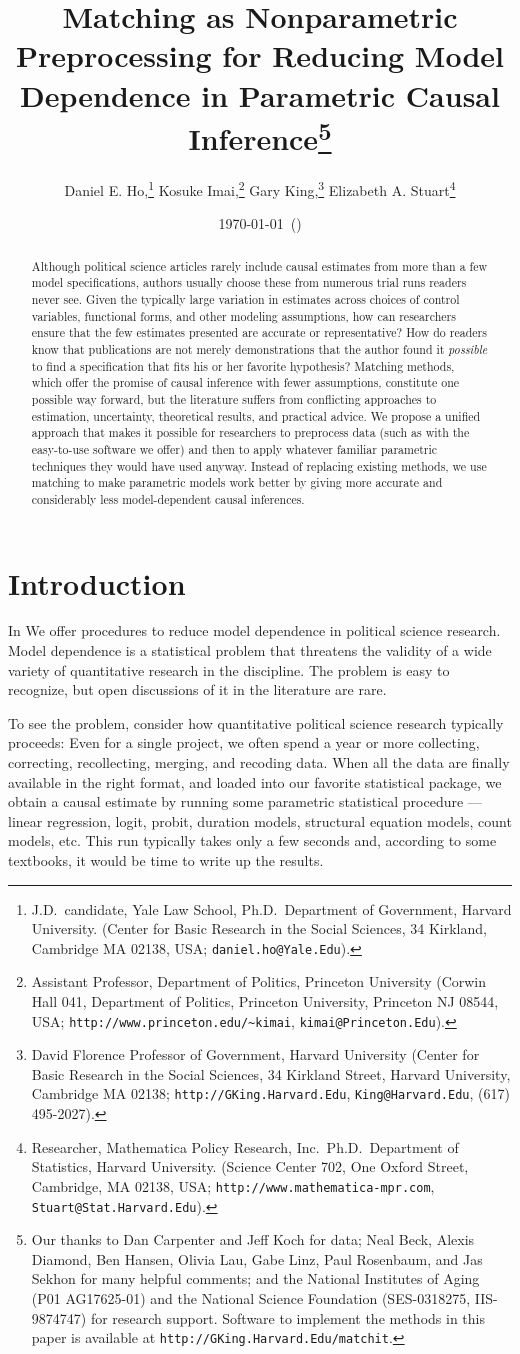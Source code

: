 \documentclass[11pt,titlepage]{article}
\title{Matching as Nonparametric Preprocessing for Reducing Model
  Dependence in Parametric Causal Inference\thanks{Our thanks to Dan
    Carpenter and Jeff Koch for data; Neal Beck, Alexis Diamond, Ben
    Hansen, Olivia Lau, Gabe Linz, Paul Rosenbaum, and Jas Sekhon for
    many helpful comments; and the National Institutes of Aging (P01
    AG17625-01) and the National Science Foundation (SES-0318275,
    IIS-9874747) for research support.  Software to implement the
    methods in this paper is available at
    \texttt{http://GKing.Harvard.Edu/matchit}.}}
\author{Daniel E. Ho,\thanks{J.D.\ candidate, Yale Law School, Ph.D.\,
    Department of Government, Harvard University. (Center for Basic
    Research in the Social Sciences, 34 Kirkland, Cambridge MA 02138,
    USA; \texttt{daniel.ho@Yale.Edu}).}
Kosuke Imai,\thanks{Assistant Professor, Department of Politics, Princeton
    University (Corwin Hall 041, Department of Politics, Princeton
    University, Princeton NJ 08544, USA;
    \texttt{http://www.princeton.edu/\~{}kimai},
    \texttt{kimai@Princeton.Edu}).}
Gary King,\thanks{David Florence Professor of Government, Harvard
  University (Center for Basic Research in the Social Sciences, 34
  Kirkland Street, Harvard University, Cambridge MA 02138;
  \texttt{http://GKing.Harvard.Edu}, \texttt{King@Harvard.Edu}, (617)
  495-2027).}
Elizabeth A. Stuart\thanks{Researcher, Mathematica Policy Research, Inc.\, Ph.D.\, Department of Statistics,
  Harvard University. (Science Center 702, One Oxford Street,
  Cambridge, MA 02138, USA;
  \texttt{http://www.mathematica-mpr.com},
  \texttt{Stuart@Stat.Harvard.Edu}).}}
\date{\today\ (\printtime)}
\begin{document}
\maketitle

\begin{abstract}
  Although political science articles rarely include causal estimates
  from more than a few model specifications, authors usually choose
  these from numerous trial runs readers never see.  Given the
  typically large variation in estimates across choices of control
  variables, functional forms, and other modeling assumptions, how can
  researchers ensure that the few estimates presented are accurate or
  representative?  How do readers know that publications are not
  merely demonstrations that the author found it \emph{possible} to
  find a specification that fits his or her favorite hypothesis?
  Matching methods, which offer the promise of causal inference with
  fewer assumptions, constitute one possible way forward, but the
  literature suffers from conflicting approaches to estimation,
  uncertainty, theoretical results, and practical advice.  We propose
  a unified approach that makes it possible for researchers to
  preprocess data (such as with the easy-to-use software we offer) and
  then to apply whatever familiar parametric techniques they would
  have used anyway.  Instead of replacing existing methods, we use
  matching to make parametric models work better by giving more
  accurate and considerably less model-dependent causal inferences.
\end{abstract}
\baselineskip

\section{Introduction}

In We offer procedures to reduce model dependence in political science
research.  Model dependence is a statistical problem that threatens
the validity of a wide variety of quantitative research in the
discipline.  The problem is easy to recognize, but open discussions of
it in the literature are rare.

To see the problem, consider how quantitative political science
research typically proceeds: Even for a single project, we often spend
a year or more collecting, correcting, recollecting, merging, and
recoding data.  When all the data are finally available in the right
format, and loaded into our favorite statistical package, we obtain a
causal estimate by running some parametric statistical procedure ---
linear regression, logit, probit, duration models, structural equation
models, count models, etc.  This run typically takes only a few
seconds and, according to some textbooks, it would be time to write up
the results.
\end{document}

